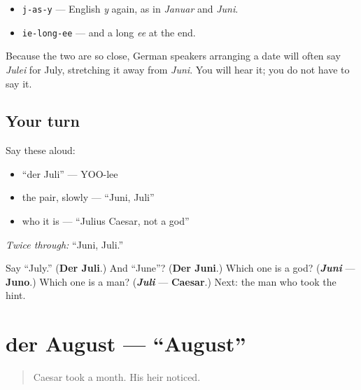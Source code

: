 \begin{sounds}
\begin{itemize}
\raggedright
  \item \texttt{j-as-y} — English \emph{y} again, as in \emph{Januar} and \emph{Juni}.
  \item \texttt{ie-long-ee} — and a long \emph{ee} at the end.
\end{itemize}

Because the two are so close, German speakers arranging a date will often say \emph{Julei} for July, stretching it away from \emph{Juni}. You will hear it; you do not have to say it.
\end{sounds}

\subsection*{Your turn}
Say these aloud:

\begin{itemize}
\raggedright
  \item \textquotedblleft{}der Juli\textquotedblright{} — YOO-lee
  \item the pair, slowly — \textquotedblleft{}Juni, Juli\textquotedblright{}
  \item who it is — \textquotedblleft{}Julius Caesar, not a god\textquotedblright{}
\end{itemize}

\emph{Twice through:} \textquotedblleft{}Juni, Juli.\textquotedblright{}

\begin{tcolorbox}[breakable,colback=teal!4,colframe=teal!35!black,title={Before you move on}]
Say \textquotedblleft{}July.\textquotedblright{} (\textbf{Der Juli}.) And \textquotedblleft{}June\textquotedblright{}? (\textbf{Der Juni}.) Which one is a god? (\emph{\textbf{Juni}} — \textbf{Juno}.) Which one is a man? (\emph{\textbf{Juli}} — \textbf{Caesar}.) Next: the man who took the hint.
\end{tcolorbox}
\section[der August]{der August — \textquotedblleft{}August\textquotedblright{}}

\label{lesson:GE-C09-august}



\begin{quote}
Caesar took a month. His heir noticed.
\end{quote}

